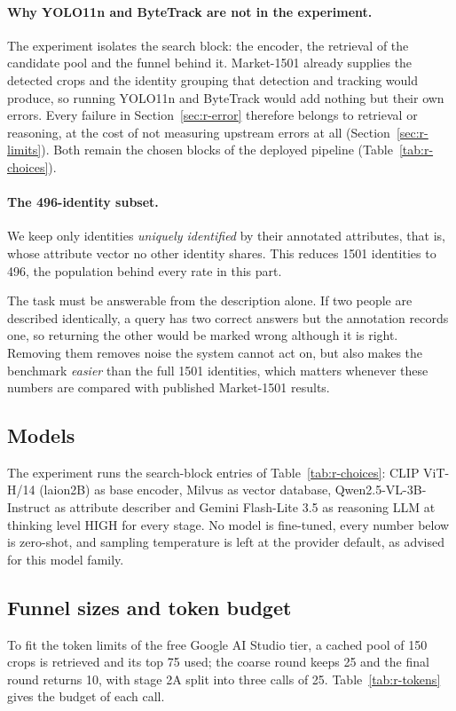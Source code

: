 \paragraph{Why YOLO11n and ByteTrack are not in the experiment.} The experiment
isolates the search block: the encoder, the retrieval of the candidate pool and
the funnel behind it. Market-1501 already supplies the detected crops and the
identity grouping that detection and tracking would produce, so running YOLO11n and
ByteTrack would add nothing but their own errors. Every failure in
Section~\ref{sec:r-error} therefore belongs to retrieval or reasoning, at the cost
of not measuring upstream errors at all (Section~\ref{sec:r-limits}). Both remain
the chosen blocks of the deployed pipeline (Table~\ref{tab:r-choices}).

\paragraph{The 496-identity subset.} We keep only identities \emph{uniquely
identified} by their annotated attributes, that is, whose attribute vector no other
identity shares. This reduces 1501 identities to 496, the population behind every
rate in this part.

The task must be answerable from the description alone. If two people are described
identically, a query has two correct answers but the annotation records one, so
returning the other would be marked wrong although it is right. Removing them
removes noise the system cannot act on, but also makes the benchmark \emph{easier}
than the full 1501 identities, which matters whenever these numbers are compared
with published Market-1501 results.

\subsection{Models}
The experiment runs the search-block entries of Table~\ref{tab:r-choices}: CLIP
ViT-H/14 (laion2B) as base encoder, Milvus as vector database,
Qwen2.5-VL-3B-Instruct as attribute describer and Gemini Flash-Lite 3.5 as
reasoning LLM at thinking level HIGH for every stage. No model is fine-tuned, every
number below is zero-shot, and sampling temperature is left at the provider
default, as advised for this model family.

\subsection{Funnel sizes and token budget}
To fit the token limits of the free Google AI Studio tier, a cached pool of 150
crops is retrieved and its top 75 used; the coarse round keeps 25 and the final
round returns 10, with stage 2A split into three calls of 25.
Table~\ref{tab:r-tokens} gives the budget of each call.


